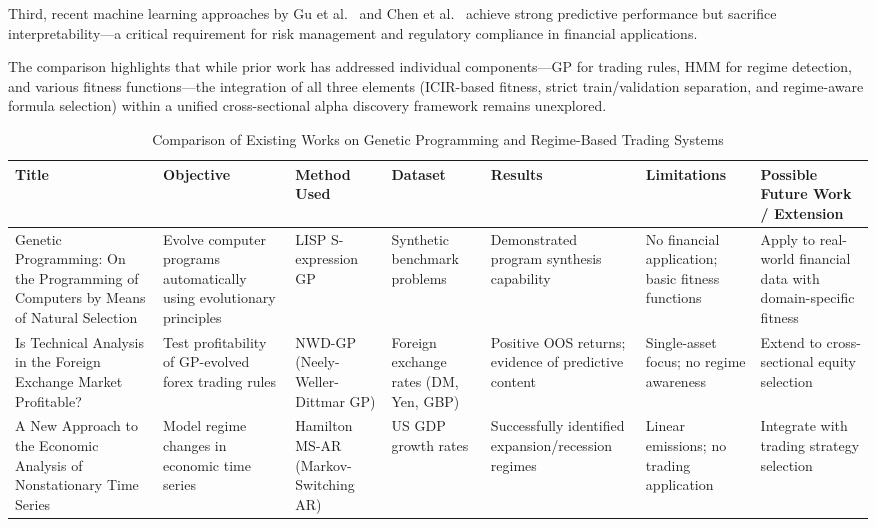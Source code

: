 \documentclass{ieeeaccess}
\begin{document}
Third, recent machine learning approaches by Gu et al.~\cite{b19} and Chen et al.~\cite{b20} achieve strong predictive performance but sacrifice interpretability---a critical requirement for risk management and regulatory compliance in financial applications.

The comparison highlights that while prior work has addressed individual components---GP for trading rules, HMM for regime detection, and various fitness functions---the integration of all three elements (ICIR-based fitness, strict train/validation separation, and regime-aware formula selection) within a unified cross-sectional alpha discovery framework remains unexplored.

\begin{table}[!htbp]
\caption{Comparison of Existing Works on Genetic Programming and Regime-Based Trading Systems}
\label{tab:related_work}
\centering
\scriptsize
\renewcommand{\arraystretch}{1.15}
\setlength{\tabcolsep}{5pt}

\begin{tabularx}{\textwidth}{|
		>{\raggedright\arraybackslash}X|
		>{\raggedright\arraybackslash}X|
		>{\raggedright\arraybackslash}X|
		>{\raggedright\arraybackslash}X|
		>{\raggedright\arraybackslash}X|
		>{\raggedright\arraybackslash}X|
		>{\raggedright\arraybackslash}X|}
	\hline
	\textbf{Title} &
	\textbf{Objective} &
	\textbf{Method Used} &
	\textbf{Dataset} &
	\textbf{Results} &
	\textbf{Limitations} &
	\textbf{Possible Future Work / Extension} \\
	\hline
	
	Genetic Programming: On the Programming of Computers by Means of Natural Selection~\cite{b6}
	&
	Evolve computer programs automatically using evolutionary principles
	&
	LISP S-expression GP
	&
	Synthetic benchmark problems
	&
	Demonstrated program synthesis capability
	&
	No financial application; basic fitness functions
	&
	Apply to real-world financial data with domain-specific fitness
	\\ \hline
	
	Is Technical Analysis in the Foreign Exchange Market Profitable?~\cite{b9}
	&
	Test profitability of GP-evolved forex trading rules
	&
	NWD-GP (Neely-Weller-Dittmar GP)
	&
	Foreign exchange rates (DM, Yen, GBP)
	&
	Positive OOS returns; evidence of predictive content
	&
	Single-asset focus; no regime awareness
	&
	Extend to cross-sectional equity selection
	\\ \hline
	
	A New Approach to the Economic Analysis of Nonstationary Time Series~\cite{b7}
	&
	Model regime changes in economic time series
	&
	Hamilton MS-AR (Markov-Switching AR)
	&
	US GDP growth rates
	&
	Successfully identified expansion/recession regimes
	&
	Linear emissions; no trading application
	&
	Integrate with trading strategy selection
	\\ \hline
	

\end{tabularx}
\end{table}
\end{document}
